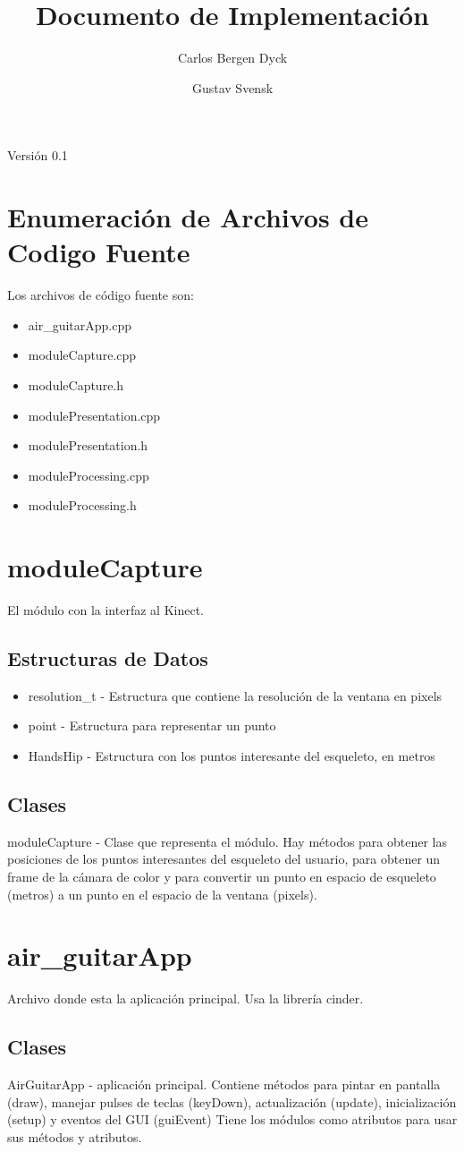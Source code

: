\documentclass[a4paper,10pt]{article}
\title{Documento de Implementación}
\author{Carlos Bergen Dyck \and Gustav Svensk}
\begin{document}
\renewcommand{\arraystretch}{1.5}
\maketitle
\begin{center}
        {\large Versión 0.1}
\end{center}
\newpage
\section{Enumeración de Archivos de Codigo Fuente}
Los archivos de código fuente son:
\begin{itemize}
\item{air\_guitarApp.cpp}
\item{moduleCapture.cpp}
\item{moduleCapture.h}
\item{modulePresentation.cpp}
\item{modulePresentation.h}
\item{moduleProcessing.cpp}
\item{moduleProcessing.h}
\end{itemize}

\section{moduleCapture}
\label{sec:captura}
El módulo con la interfaz al Kinect.
\subsection{Estructuras de Datos}
\begin{itemize}
\item{resolution\_t - Estructura que contiene la resolución de la ventana en pixels}
\item{point - Estructura para representar un punto}
\item{HandsHip - Estructura con los puntos interesante del esqueleto, en metros}
\end{itemize}
\subsection{Clases}
moduleCapture - Clase que representa el módulo.
Hay métodos para obtener las posiciones de los puntos interesantes del esqueleto del 
usuario, para obtener un frame de la cámara de color y para convertir un punto en espacio de
esqueleto (metros) a un punto en el espacio de la ventana (pixels).

\section{air\_guitarApp}
Archivo donde esta la aplicación principal. Usa la librería cinder.
\subsection{Clases}
AirGuitarApp - aplicación principal.
Contiene métodos para pintar en pantalla (draw), manejar pulses de teclas (keyDown), 
actualización (update), inicialización (setup) y eventos del GUI (guiEvent)
Tiene los módulos como atributos para usar sus métodos y atributos.
\end{document}
